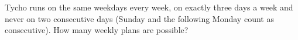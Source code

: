 Tycho runs on the same weekdays every week, on exactly three days a week and never on two consecutive days (Sunday and the following Monday count as consecutive). How many weekly plans are possible?
